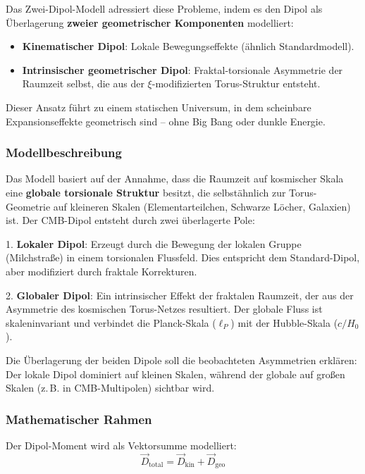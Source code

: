 	Das Zwei-Dipol-Modell adressiert diese Probleme, indem es den Dipol als Überlagerung \textbf{zweier geometrischer Komponenten} modelliert:
	\begin{itemize}
		\item \textbf{Kinematischer Dipol}: Lokale Bewegungseffekte (ähnlich Standardmodell).
		\item \textbf{Intrinsischer geometrischer Dipol}: Fraktal-torsionale Asymmetrie der Raumzeit selbst, die aus der $\xi$-modifizierten Torus-Struktur entsteht.
	\end{itemize}
	
	Dieser Ansatz führt zu einem statischen Universum, in dem scheinbare Expansionseffekte geometrisch sind – ohne Big Bang oder dunkle Energie.
	
	\subsubsection{Modellbeschreibung}
	
	Das Modell basiert auf der Annahme, dass die Raumzeit auf kosmischer Skala eine \textbf{globale torsionale Struktur} besitzt, die selbstähnlich zur Torus-Geometrie auf kleineren Skalen (Elementarteilchen, Schwarze Löcher, Galaxien) ist. Der CMB-Dipol entsteht durch zwei überlagerte Pole:
	
	1. \textbf{Lokaler Dipol}: Erzeugt durch die Bewegung der lokalen Gruppe (Milchstraße) in einem torsionalen Flussfeld. Dies entspricht dem Standard-Dipol, aber modifiziert durch fraktale Korrekturen.
	
	2. \textbf{Globaler Dipol}: Ein intrinsischer Effekt der fraktalen Raumzeit, der aus der Asymmetrie des kosmischen Torus-Netzes resultiert. Der globale Fluss ist skaleninvariant und verbindet die Planck-Skala ($\ell_P$) mit der Hubble-Skala ($c/H_0$).
	
	Die Überlagerung der beiden Dipole soll die beobachteten Asymmetrien erklären: Der lokale Dipol dominiert auf kleinen Skalen, während der globale auf großen Skalen (z.\,B. in CMB-Multipolen) sichtbar wird.
	
	\subsubsection{Mathematischer Rahmen}
	
	Der Dipol-Moment wird als Vektorsumme modelliert:
	\begin{equation}
		\vec{D}_{\text{total}} = \vec{D}_{\text{kin}} + \vec{D}_{\text{geo}}
		\label{eq:two_dipole}
	\end{equation}
	
